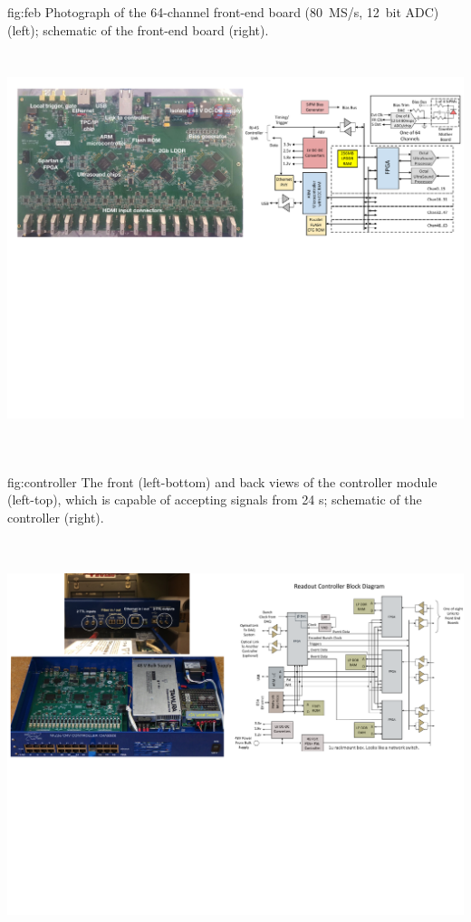 \begin{dunefigure}
 {fig:feb}
 {Photograph of the 64-channel  front-end board (\SI{80}{MS/s}, \SI{12}{bit} ADC) (left); schematic of the front-end board (right).}
\includegraphics[height=4.8in]{graphics/pds-feb-tdr.pdf} 
\vspace{-6.3cm}
\end{dunefigure}

\begin{dunefigure}
 {fig:controller}
 {The front (left-bottom) and back views of the controller module (left-top), which is capable of accepting signals from 24 s; schematic of the controller (right).}
\includegraphics[height=5.0in]{graphics/pds-controller.pdf} 
\vspace{-5.5cm}
\end{dunefigure}

